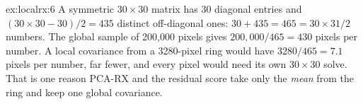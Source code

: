 \begin{solution}{ex:localrx:6}
A symmetric $30\times30$ matrix has $30$ diagonal entries and $(30\times30 - 30)/2 = 435$ distinct
off-diagonal ones: $30 + 435 = 465 = 30\times31/2$ numbers. The global sample of 200,000 pixels gives
$200{,}000/465 = 430$ pixels per number. A local covariance from a 3280-pixel ring would have
$3280/465 = 7.1$ pixels per number, far fewer, and every pixel would need its own $30\times30$ solve.
That is one reason PCA-RX and the residual score take only the \emph{mean} from the ring and keep one
global covariance.
\end{solution}
